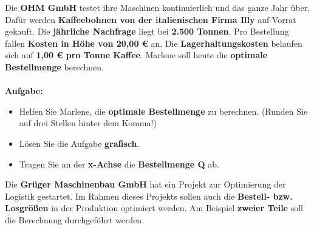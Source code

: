 Die \textbf{OHM GmbH} testet ihre Maschinen kontinuierlich und das ganze Jahr über.  
Dafür werden \textbf{Kaffeebohnen von der italienischen Firma Illy} auf Vorrat gekauft.  
Die \textbf{jährliche Nachfrage} liegt bei \textbf{2.500 Tonnen}.  
Pro Bestellung fallen \textbf{Kosten in Höhe von 20,00 €} an.  
Die \textbf{Lagerhaltungskosten} belaufen sich auf \textbf{1,00 € pro Tonne Kaffee}.  
Marlene soll heute die \textbf{optimale Bestellmenge} berechnen.  
\\~\\
\textbf{Aufgabe:}
\begin{itemize}
    \item Helfen Sie Marlene, die \textbf{optimale Bestellmenge} zu berechnen. (Runden Sie auf drei Stellen hinter dem Komma!)
    \item Lösen Sie die Aufgabe \textbf{grafisch}.
    \item Tragen Sie an der \textbf{x-Achse} die \textbf{Bestellmenge Q} ab.
\end{itemize}


Die \textbf{Gr\"uger Maschinenbau GmbH} hat ein Projekt zur Optimierung der Logistik gestartet.  
Im Rahmen dieses Projekts sollen auch die \textbf{Bestell- bzw. Losgr\"o\ss{}en} in der Produktion optimiert werden.  
Am Beispiel \textbf{zweier Teile} soll die Berechnung durchgef\"uhrt werden.

